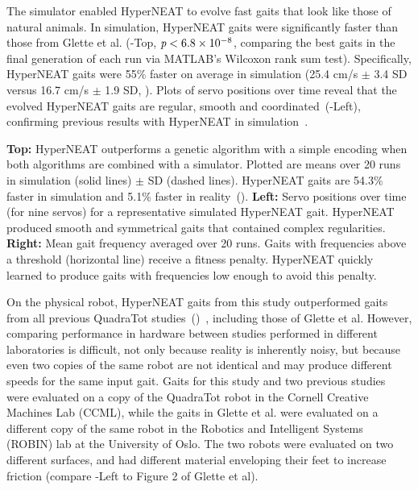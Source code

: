 

The simulator enabled HyperNEAT to evolve
fast gaits that look like those of natural animals. In simulation, HyperNEAT gaits were significantly faster than those from Glette et al. (-Top, $\emph{p} < 6.8\times10^{-8}$, comparing the best gaits in the final generation of each run via MATLAB's Wilcoxon rank sum test).  
Specifically, HyperNEAT gaits were 55\% faster on average in simulation (25.4
cm/s $\pm$ 3.4 SD versus 16.7 cm/s $\pm$ 1.9 SD, ).
Plots of servo positions over time reveal that the evolved HyperNEAT gaits are regular, smooth and coordinated~(-Left), confirming previous results with HyperNEAT in simulation~\cite{clune2011performance,clune2009evolving}.

{
\textbf{Top: }
HyperNEAT outperforms a genetic algorithm with a simple encoding when both algorithms are combined with a simulator. Plotted are means over 20 runs in simulation (solid lines) $\pm$ SD (dashed lines). HyperNEAT gaits are 54.3\% faster in
simulation and 5.1\% faster in reality~().
\textbf{Left: }
Servo positions over time (for nine servos) for a representative simulated HyperNEAT gait. HyperNEAT produced smooth and symmetrical gaits that contained complex regularities. 
\textbf{Right: }Mean gait frequency averaged over 20 runs. 
Gaits with frequencies above a threshold (horizontal line) receive a fitness penalty. HyperNEAT quickly learned to produce gaits with frequencies low enough to avoid this penalty.
}


On the physical robot, HyperNEAT gaits from this study outperformed gaits from all previous QuadraTot studies~()~\cite{yos:clune,haocheng,glette}, including those of Glette et al. 
 However, comparing performance in hardware between studies performed in
different laboratories is difficult, not only because reality is
inherently noisy, but because even two copies of the same robot are
not identical and may produce different speeds for the same input
gait. Gaits for this study and two previous studies~\cite{yos:clune,haocheng} were evaluated on a copy of the QuadraTot robot in the Cornell Creative Machines Lab (CCML), while the gaits in Glette et al. were evaluated on a different copy of the same robot in the Robotics and
Intelligent Systems (ROBIN) lab at the University of Oslo. The two robots were evaluated on two different surfaces, and had different material enveloping their feet to increase friction (compare -Left to Figure 2 of Glette et al). 


